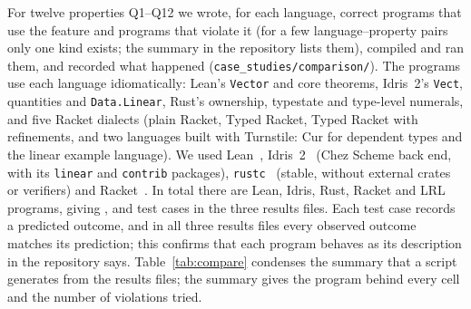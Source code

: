 For twelve properties Q1--Q12 we wrote, for each language, correct programs that use the feature and programs that violate it (for a few language--property pairs only one kind exists; the summary in the repository lists them), compiled and ran them, and recorded what happened (\texttt{case\_studies/comparison/}).
The programs use each language idiomatically: Lean's \lstinline|Vector| and core theorems, Idris~2's \lstinline|Vect|, quantities and \lstinline|Data.Linear|, Rust's ownership, typestate and type-level numerals, and five Racket dialects (plain Racket, Typed Racket, Typed Racket with refinements, and two languages built with Turnstile: Cur for dependent types and the linear example language).
We used Lean~\ToolLean, Idris~2~\ToolIdris{} (Chez Scheme back end, with its \lstinline|linear| and \lstinline|contrib| packages), \texttt{rustc}~\ToolRustc{} (stable, without external crates or verifiers) and Racket~\ToolRacket.
In total there are \NumCmpFilesLean{} Lean, \NumCmpFilesIdrisTwo{} Idris, \NumCmpFilesRust{} Rust, \NumCmpFilesRacket{} Racket and \NumCmpFilesLrl{} LRL programs, giving \NumCmpLeanIdrisCases{}, \NumCmpRustRacketCases{} and \NumCmpLrlCases{} test cases in the three results files.
Each test case records a predicted outcome, and in all three results files every observed outcome matches its prediction; this confirms that each program behaves as its description in the repository says.
Table~\ref{tab:compare} condenses the summary that a script generates from the results files; the summary gives the program behind every cell and the number of violations tried.

